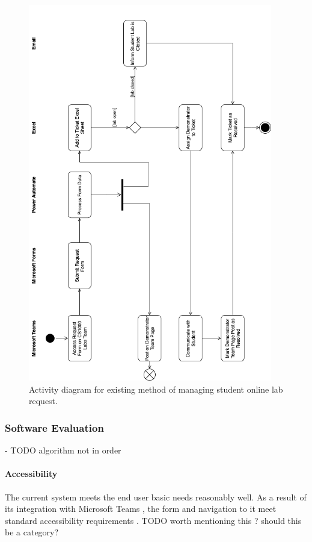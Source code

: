 \documentclass[a4paper,11pt]{article}
\begin{document}
\FloatBarrier
\begin{figure}[H]
  \centering
  \includegraphics[width=0.95\textwidth]{activityPostExisting.png}
  \caption{Activity diagram for existing method of managing student online lab request.}
\end{figure}

\subsubsection{Software Evaluation}

- TODO algorithm not in order

\paragraph{Accessibility}
The current system meets the end user basic needs reasonably well. As a result of its integration with Microsoft Teams \cite{teams}, the form and navigation to it meet standard accessibility requirements \cite{formaccess} \cite{teamsaccess}. TODO worth mentioning this ? should this be a category?
\end{document}
